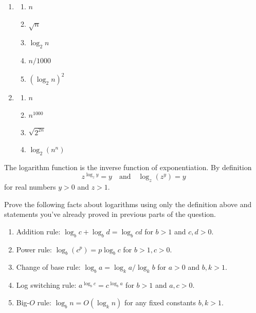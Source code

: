 \documentclass[12 pt, letterpaper]{hmcpset}
\begin{document}
\begin{solution}
	\begin{enumerate}[label = \arabic*.]
		\item
			\begin{enumerate}
				\item[(a)] $n$
				\item[(d)] $\sqrt{n}$
				\item[(e)] $\log_{2}{n}$
				\item[(f)] $n / 1000$
				\item[(h)] $(\log_{2} n)^{2}$
			\end{enumerate}

		\item
			\begin{enumerate}
				\item[(a)] $n$ 
				\item[(b)] $n^{1000}$
				\item[(e)] $\sqrt{2^{2n}}$
				\item[(h)] $\log_{2}(n^{n})$
			\end{enumerate}
	\end{enumerate}
\end{solution}

\pagebreak

\begin{problem}
	The logarithm function is the inverse function of exponentiation. By definition
	\[
		z^{\log_{z} y} = y \quad \text{and} \quad \log_{z}(z^{y}) = y
	\]
	for real numbers $y > 0$ and $z > 1$.

	Prove the following facts about logarithms using only the definition above and statements you've already proved in previous parts of the question.

	\begin{enumerate}
		\item Addition rule: $\log_{b} c + \log_{b} d = \log_{b} cd$ for $b > 1$ and $c, d > 0$.

		\item Power rule: $\log_{b}(c^{p}) = p \log_{b} c$ for $b > 1, c > 0$.

		\item Change of base rule: $\log_{b} a = \log_{k} a / \log_{k} b$ for $a > 0$ and $b, k > 1$.

		\item Log switching rule: $a^{\log_{b} c} = c^{\log_{b} a}$ for $b > 1$ and $a, c > 0$.

		\item Big-$O$ rule: $\log_{b}n = O(\log_{k} n)$ for any fixed constants $b, k > 1$.
	\end{enumerate} 
\end{problem}
\end{document}
